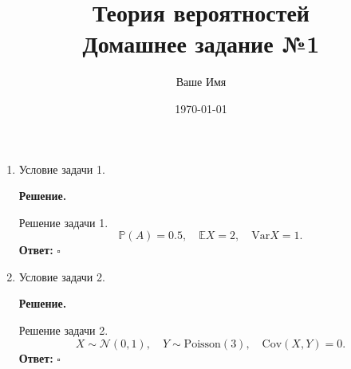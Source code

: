 \documentclass[12pt]{article}
\title{\textbf{Теория вероятностей}\\Домашнее задание №1}
\author{Ваше Имя}
\date{\today}
\newcommand{\Normal}{\mathcal{N}}
\newcommand{\Poisson}{\mathrm{Poisson}}
\newenvironment{solution}{\textbf{Решение.}\par}{\hfill$\square$}
\newcommand{\answer}[1]{\textbf{Ответ:} \boxed{#1}}
\newcommand{\Pp}{\mathbb{P}}
\newcommand{\Ee}{\mathbb{E}}
\newcommand{\Var}{\mathrm{Var}}
\newcommand{\Cov}{\mathrm{Cov}}
\newcommand{\dist}{\sim}
\begin{document}
\maketitle

\begin{enumerate}[label=\textbf{\arabic*.}, left=0pt]

\item Условие задачи 1.

\begin{solution}
Решение задачи 1.
\[
\Pp(A) = 0.5, \quad \Ee X = 2, \quad \Var X = 1.
\]
\answer{0.5}
\end{solution}

\item Условие задачи 2.

\begin{solution}
Решение задачи 2.
\[
X \dist \Normal(0,1), \quad Y \dist \Poisson(3), \quad \Cov(X,Y)=0.
\]
\answer{3}
\end{solution}

\end{enumerate}
\end{document}
